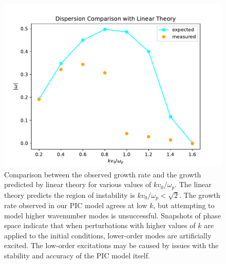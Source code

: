 \documentclass[%
 reprint,
 amsmath,amssymb,
 aps,
]{revtex4-2}
\begin{document}
\begin{figure}
\includegraphics[width=0.9\linewidth]{proj3/dispersion_two_stream.pdf}
\caption{\label{fig:dispersion-measured-comparison}Comparison between the observed growth rate and the growth predicted by linear theory for various values of $k v_0 / \omega_p$. The linear theory predicts the region of instability is $k v_0 / \omega_p < \sqrt{2}$. The growth rate observed in our PIC model agrees at low $k$, but attempting to model higher wavenumber modes is unsuccessful. Snapshots of phase space indicate that when perturbations with higher values of $k$ are applied to the initial conditions, lower-order modes are artificially excited. The low-order excitations may be caused by issues with the stability and accuracy of the PIC model itself.}
\end{figure}
\end{document}
